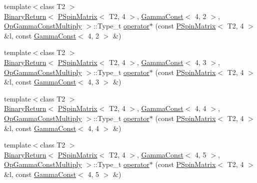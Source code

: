 \begin{DoxyCompactItemize}
\item 
{\footnotesize template$<$class T2 $>$ }\\\mbox{\hyperlink{structENSEM_1_1BinaryReturn}{Binary\+Return}}$<$ \mbox{\hyperlink{classENSEM_1_1PSpinMatrix}{P\+Spin\+Matrix}}$<$ T2, 4 $>$, \mbox{\hyperlink{classENSEM_1_1GammaConst}{Gamma\+Const}}$<$ 4, 2 $>$, \mbox{\hyperlink{structENSEM_1_1OpGammaConstMultiply}{Op\+Gamma\+Const\+Multiply}} $>$\+::Type\+\_\+t \mbox{\hyperlink{group__primspinmatrix_ga5a4c1e3861766e39bd44a3b7be45b5bb}{operator$\ast$}} (const \mbox{\hyperlink{classENSEM_1_1PSpinMatrix}{P\+Spin\+Matrix}}$<$ T2, 4 $>$ \&l, const \mbox{\hyperlink{classENSEM_1_1GammaConst}{Gamma\+Const}}$<$ 4, 2 $>$ \&)
\item 
{\footnotesize template$<$class T2 $>$ }\\\mbox{\hyperlink{structENSEM_1_1BinaryReturn}{Binary\+Return}}$<$ \mbox{\hyperlink{classENSEM_1_1PSpinMatrix}{P\+Spin\+Matrix}}$<$ T2, 4 $>$, \mbox{\hyperlink{classENSEM_1_1GammaConst}{Gamma\+Const}}$<$ 4, 3 $>$, \mbox{\hyperlink{structENSEM_1_1OpGammaConstMultiply}{Op\+Gamma\+Const\+Multiply}} $>$\+::Type\+\_\+t \mbox{\hyperlink{group__primspinmatrix_ga4489f67258a145c07f7805077699ec24}{operator$\ast$}} (const \mbox{\hyperlink{classENSEM_1_1PSpinMatrix}{P\+Spin\+Matrix}}$<$ T2, 4 $>$ \&l, const \mbox{\hyperlink{classENSEM_1_1GammaConst}{Gamma\+Const}}$<$ 4, 3 $>$ \&)
\item 
{\footnotesize template$<$class T2 $>$ }\\\mbox{\hyperlink{structENSEM_1_1BinaryReturn}{Binary\+Return}}$<$ \mbox{\hyperlink{classENSEM_1_1PSpinMatrix}{P\+Spin\+Matrix}}$<$ T2, 4 $>$, \mbox{\hyperlink{classENSEM_1_1GammaConst}{Gamma\+Const}}$<$ 4, 4 $>$, \mbox{\hyperlink{structENSEM_1_1OpGammaConstMultiply}{Op\+Gamma\+Const\+Multiply}} $>$\+::Type\+\_\+t \mbox{\hyperlink{group__primspinmatrix_gafa880313515ac76955c6c4de7513add3}{operator$\ast$}} (const \mbox{\hyperlink{classENSEM_1_1PSpinMatrix}{P\+Spin\+Matrix}}$<$ T2, 4 $>$ \&l, const \mbox{\hyperlink{classENSEM_1_1GammaConst}{Gamma\+Const}}$<$ 4, 4 $>$ \&)
\item 
{\footnotesize template$<$class T2 $>$ }\\\mbox{\hyperlink{structENSEM_1_1BinaryReturn}{Binary\+Return}}$<$ \mbox{\hyperlink{classENSEM_1_1PSpinMatrix}{P\+Spin\+Matrix}}$<$ T2, 4 $>$, \mbox{\hyperlink{classENSEM_1_1GammaConst}{Gamma\+Const}}$<$ 4, 5 $>$, \mbox{\hyperlink{structENSEM_1_1OpGammaConstMultiply}{Op\+Gamma\+Const\+Multiply}} $>$\+::Type\+\_\+t \mbox{\hyperlink{group__primspinmatrix_ga02ed9e6e920eca4f600dd06655fb2a42}{operator$\ast$}} (const \mbox{\hyperlink{classENSEM_1_1PSpinMatrix}{P\+Spin\+Matrix}}$<$ T2, 4 $>$ \&l, const \mbox{\hyperlink{classENSEM_1_1GammaConst}{Gamma\+Const}}$<$ 4, 5 $>$ \&)

\end{DoxyCompactItemize}
